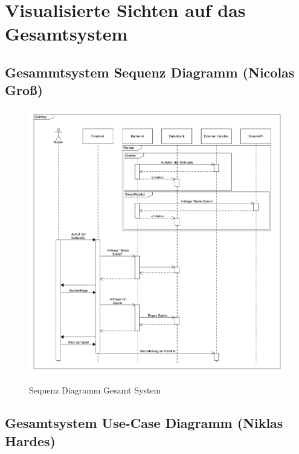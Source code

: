 
\section{Visualisierte Sichten auf das Gesamtsystem}

\subsection*{Gesammtsystem Sequenz Diagramm (Nicolas Groß)}


\begin{figure}[hbt!]
    \begin{minipage}[t]{1\textwidth} %
        \caption{Sequenz Diagramm Gesamt System} %
        \includegraphics[width=1\textwidth]{img/sequence_system.png}\\ %
    \end{minipage}
\end{figure}
\newpage
\subsection*{Gesamtsystem Use-Case Diagramm (Niklas Hardes)}

